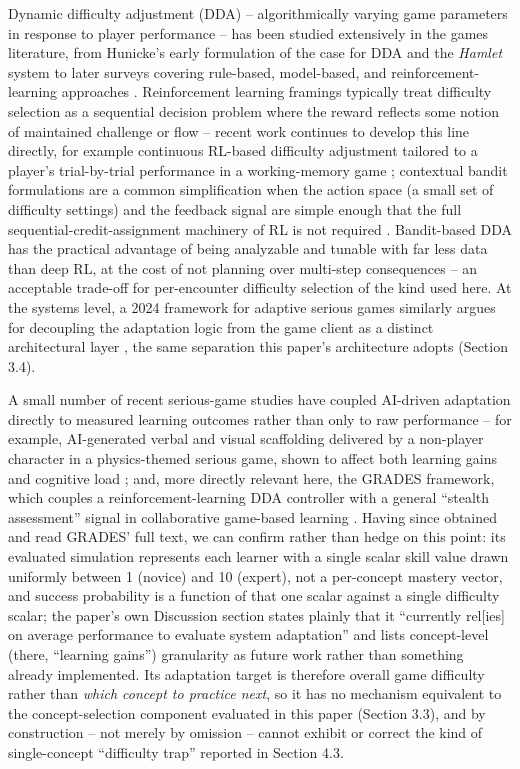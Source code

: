 \documentclass[11pt]{article}
\begin{document}
Dynamic difficulty adjustment (DDA) -- algorithmically varying game parameters in response to player performance -- has been studied extensively in the games literature, from Hunicke's early formulation of the case for DDA and the \textit{Hamlet} system \cite{ref22} to later surveys covering rule-based, model-based, and reinforcement-learning approaches \cite{ref23,ref24}. Reinforcement learning framings typically treat difficulty selection as a sequential decision problem where the reward reflects some notion of maintained challenge or flow -- recent work continues to develop this line directly, for example continuous RL-based difficulty adjustment tailored to a player's trial-by-trial performance in a working-memory game \cite{ref30}; contextual bandit formulations are a common simplification when the action space (a small set of difficulty settings) and the feedback signal are simple enough that the full sequential-credit-assignment machinery of RL is not required \cite{ref25}. Bandit-based DDA has the practical advantage of being analyzable and tunable with far less data than deep RL, at the cost of not planning over multi-step consequences -- an acceptable trade-off for per-encounter difficulty selection of the kind used here. At the systems level, a 2024 framework for adaptive serious games similarly argues for decoupling the adaptation logic from the game client as a distinct architectural layer \cite{ref37}, the same separation this paper's architecture adopts (Section 3.4).

A small number of recent serious-game studies have coupled AI-driven adaptation directly to measured learning outcomes rather than only to raw performance -- for example, AI-generated verbal and visual scaffolding delivered by a non-player character in a physics-themed serious game, shown to affect both learning gains and cognitive load \cite{ref10}; and, more directly relevant here, the GRADES framework, which couples a reinforcement-learning DDA controller with a general ``stealth assessment'' signal in collaborative game-based learning \cite{ref40}. Having since obtained and read GRADES' full text, we can confirm rather than hedge on this point: its evaluated simulation represents each learner with a single scalar skill value drawn uniformly between 1 (novice) and 10 (expert), not a per-concept mastery vector, and success probability is a function of that one scalar against a single difficulty scalar; the paper's own Discussion section states plainly that it ``currently rel[ies] on average performance to evaluate system adaptation'' and lists concept-level (there, ``learning gains'') granularity as future work rather than something already implemented. Its adaptation target is therefore overall game difficulty rather than \textit{which concept to practice next}, so it has no mechanism equivalent to the concept-selection component evaluated in this paper (Section 3.3), and by construction -- not merely by omission -- cannot exhibit or correct the kind of single-concept ``difficulty trap'' reported in Section 4.3.
\end{document}
